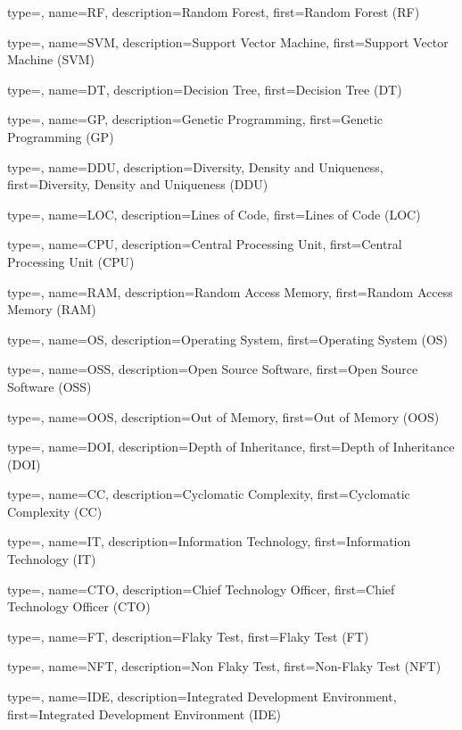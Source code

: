 {
	type=\acronymtype,
	name={RF},
	description={Random Forest},
	first={Random Forest (RF)}
}

{
	type=\acronymtype,
	name={SVM},
	description={Support Vector Machine},
	first={Support Vector Machine (SVM)}
}

{
	type=\acronymtype,
	name={DT},
	description={Decision Tree},
	first={Decision Tree (DT)}
}

{
	type=\acronymtype,
	name={GP},
	description={Genetic Programming},
	first={Genetic Programming (GP)}
}

{
	type=\acronymtype,
	name={DDU},
	description={Diversity, Density and Uniqueness},
	first={Diversity, Density and Uniqueness (DDU)}
}

{
	type=\acronymtype,
	name={LOC},
	description={Lines of Code},
	first={Lines of Code (LOC)}
}

{
	type=\acronymtype,
	name={CPU},
	description={Central Processing Unit},
	first={Central Processing Unit (CPU)}
}

{
	type=\acronymtype,
	name={RAM},
	description={Random Access Memory},
	first={Random Access Memory (RAM)}
}

{
	type=\acronymtype,
	name={OS},
	description={Operating System},
	first={Operating System (OS)}
}

{
	type=\acronymtype,
	name={OSS},
	description={Open Source Software},
	first={Open Source Software (OSS)}
}

{
	type=\acronymtype,
	name={OOS},
	description={Out of Memory},
	first={Out of Memory (OOS)}
}

{
	type=\acronymtype,
	name={DOI},
	description={Depth of Inheritance},
	first={Depth of Inheritance (DOI)}
}

{
	type=\acronymtype,
	name={CC},
	description={Cyclomatic Complexity},
	first={Cyclomatic Complexity (CC)}
}

{
	type=\acronymtype,
	name={IT},
	description={Information Technology},
	first={Information Technology (IT)}
}

{
	type=\acronymtype,
	name={CTO},
	description={Chief Technology Officer},
	first={Chief Technology Officer (CTO)}
}

{
	type=\acronymtype,
	name={FT},
	description={Flaky Test},
	first={Flaky Test (FT)}
}

{
	type=\acronymtype,
	name={NFT},
	description={Non Flaky Test},
	first={Non-Flaky Test (NFT)}
}

{
	type=\acronymtype,
	name={IDE},
	description={Integrated Development Environment},
	first={Integrated Development Environment (IDE)}
}
